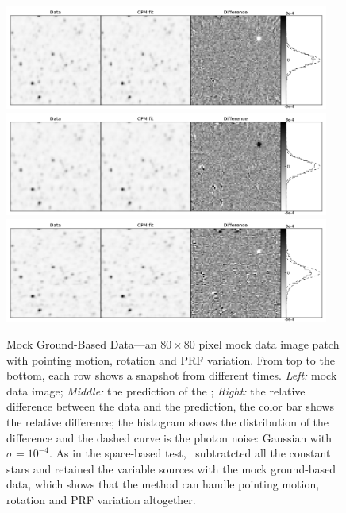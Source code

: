 \begin{figure}[p]
\begin{center}
\includegraphics[width=0.95\textwidth]{figures/cdi/f3a}
\includegraphics[width=0.95\textwidth]{figures/cdi/f3b}
\includegraphics[width=0.95\textwidth]{figures/cdi/f3c}
\end{center}
\caption[The \cpmdiff\ for mock ground-based data]{
  \label{ground}
  Mock Ground-Based Data---an $80\times 80$ pixel mock data image patch with pointing motion, rotation and PRF variation. 
  From top to the bottom,  each row shows a snapshot from different times.
  \emph{Left:} mock data image;
  \emph{Middle:} the prediction of the \cpmdiff;
  \emph{Right:} the relative difference between the data and the prediction, the color bar shows the relative difference; 
  the histogram shows the distribution of the difference and the dashed curve is the photon noise: Gaussian with $\sigma = 10^{-4}$. 
  As in the space-based test, \cpmdiff\ subtratcted all the constant stars and retained the variable sources with the mock ground-based data, which shows that the method can handle pointing motion, rotation and PRF variation altogether. 
}
\end{figure}


